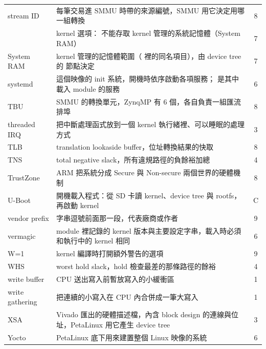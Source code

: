 \begin{xltabular}{\textwidth}{l X c}
stream ID & 每筆交易進 SMMU 時帶的來源編號，SMMU 用它決定用哪一組轉換 & 8 \\
 & kernel 選項： 不能存取 kernel 管理的系統記憶體（System RAM） & 7 \\
System RAM & kernel 管理的記憶體範圍（ 裡的同名項目），由 device tree 的  節點決定 & 7 \\
systemd & 這個映像的 init 系統，開機時依序啟動各項服務； 是其中載入 module 的服務 & 6 \\
TBU & SMMU 的轉換單元，ZynqMP 有 6 個，各自負責一組匯流排埠 & 8 \\
threaded IRQ & 把中斷處理函式放到一個 kernel 執行緒裡、可以睡眠的處理方式 & 3 \\
TLB & translation lookaside buffer，位址轉換結果的快取 & 8 \\
TNS & total negative slack，所有違規路徑的負餘裕加總 & 4 \\
TrustZone & ARM 把系統分成 Secure 與 Non-secure 兩個世界的硬體機制 & 8 \\
U-Boot & 開機載入程式：從 SD 卡讀 kernel、device tree 與 rootfs，再啟動 kernel & C \\
vendor prefix &  字串逗號前面那一段，代表廠商或作者 & 9 \\
vermagic & module 裡記錄的 kernel 版本與主要設定字串，載入時必須和執行中的 kernel 相同 & 6 \\
W=1 & kernel 編譯時打開額外警告的選項 & 9 \\
WHS & worst hold slack，hold 檢查最差的那條路徑的餘裕 & 4 \\
write buffer & CPU 送出寫入前暫放寫入的小緩衝區 & 1 \\
write gathering & 把連續的小寫入在 CPU 內合併成一筆大寫入 & 1 \\
XSA & Vivado 匯出的硬體描述檔，內含 block design 的連線與位址，PetaLinux 用它產生 device tree & 3 \\
Yocto & PetaLinux 底下用來建置整個 Linux 映像的系統 & 6 \\
\bottomrule
\end{xltabular}
\normalsize
